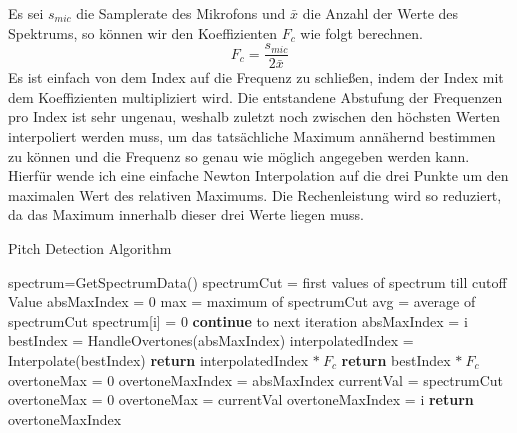 Es sei $s_{mic}$ die Samplerate des Mikrofons und $\bar{x}$ die Anzahl der Werte des Spektrums, so können wir den Koeffizienten $F_c$ wie folgt berechnen.
$$ F_c = \frac{s_{mic}}{2\bar{x}} $$
Es ist einfach von dem Index auf die Frequenz zu schließen, indem der Index mit dem Koeffizienten multipliziert wird. Die entstandene Abstufung der Frequenzen pro Index ist sehr ungenau, weshalb zuletzt noch zwischen den höchsten Werten interpoliert werden muss, um das tatsächliche Maximum annähernd bestimmen zu können und die Frequenz so genau wie möglich angegeben werden kann. Hierfür wende ich eine einfache Newton Interpolation auf die drei Punkte um den maximalen Wert des relativen Maximums. Die Rechenleistung wird so reduziert, da das Maximum innerhalb dieser drei Werte liegen muss. 

\begin{algorithm}
    \caption{Pitch Detection Algorithm} \label{pda}
   \begin{algorithmic}[1]
        \State spectrum=GetSpectrumData()
        \State spectrumCut = first values of spectrum till cutoff Value 
        \State absMaxIndex = 0 
        \State max = maximum of spectrumCut
        \State avg = average of spectrumCut
                \State spectrum[i] = 0
                \State \textbf{continue} to next iteration
            \EndIf
                \State absMaxIndex = i
            \EndIf
        \EndFor
        \State bestIndex = HandleOvertones(absMaxIndex)
        \State interpolatedIndex = Interpolate(bestIndex)
            \State \textbf{return} interpolatedIndex $* \ F_c$
        \EndIf
        \State \textbf{return} bestIndex $* \ F_c$
   \EndFunction
    \State
        \State overtoneMax = 0
        \State overtoneMaxIndex = absMaxIndex
            \State currentVal = spectrumCut
                \State overtoneMax = 0
            \EndIf
                    \State overtoneMax = currentVal
                    \State overtoneMaxIndex = i
                \EndIf
            \EndIf
        \EndFor
        \State \textbf{return} overtoneMaxIndex
    \EndFunction
    \end{algorithmic}
\end{algorithm}

